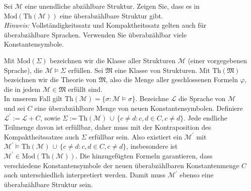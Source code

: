 
\begin{exercise}[130]

Sei $\mathscr{M}$ eine unendliche abzählbare Struktur. Zeigen Sie, dass es in
$\mathrm{Mod}(\mathrm{Th}(\mathscr{M}))$ eine überabzählbare Struktur gibt. \\
\textit{Hinweis:} Vollständigkeitssatz und Kompaktheitssatz gelten auch für
überabzählbare Sprachen. Verwenden Sie überabzählbar viele Konstantensymbole.

\end{exercise}


\begin{solution}
Mit $\mathrm{Mod}(\Sigma)$ bezeichnen wir die Klasse aller Strukturen $\mathscr{M}$
(einer vorgegebenen Sprache), die $\mathscr{M} \vDash \Sigma$ erfüllen.
Sei $\mathfrak{M}$ eine Klasse von Strukturen. Mit $\mathrm{Th}(\mathfrak{M})$ bezeichnen
wir die Theorie von $\mathfrak{M}$, also die Menge aller geschlossenen Formeln $\varphi$,
die in jedem $\mathscr{M} \in \mathfrak{M}$ erfüllt sind. \\
In unserem Fall gilt $\mathrm{Th}(\mathscr{M}) = \{\sigma: \mathscr{M} \vDash \sigma\}$.
Bezeichne $\mathscr{L}$ die Sprache von $\mathscr{M}$ und sei $C$ eine überabzählbare
Menge von neuen Konstantensymbolen. Definiere $\mathscr{L}^{\prime} := \mathscr{L} + C$, sowie
$\Sigma := \mathrm{Th}(\mathscr{M})\, \cup\, \{c \neq d: c,d \in C, c \neq d \}$.
Jede endliche Teilmenge davon ist erfüllbar, daher muss mit der Kontraposition
des Kompaktheitssatzes auch $\Sigma$ erfüllbar sein. Also existiert ein $\mathscr{M}^{\prime}$
mit $\mathscr{M}^{\prime} \vDash \mathrm{Th}(\mathscr{M})\, \cup\, \{c \neq d: c,d \in C, c \neq d \}$,
insbesondere ist $\mathscr{M}^{\prime} \in \mathrm{Mod}(\mathrm{Th}(\mathscr{M}))$.
Die hinzugefügten Formeln garantieren, dass verschiedene Konstantensymbole der
neuen überabzählbaren Konstantenmenge $C$ auch unterschiedlich interpretiert werden.
Damit muss $\mathscr{M}^{\prime}$ ebenso eine überabzählbare Struktur sein.

\end{solution}

